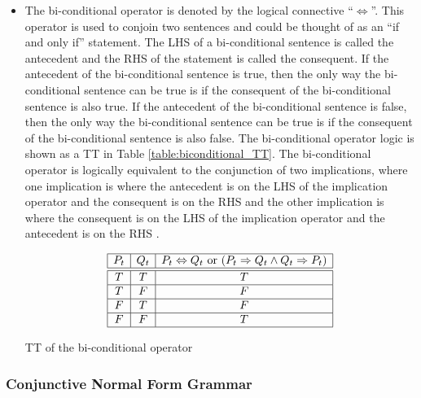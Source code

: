\begin{itemize}
\vspace{-1 cm}
	
	\item The bi-conditional operator is denoted by the logical connective ``$\Leftrightarrow$''. This operator is used to conjoin two sentences and could be thought of as an ``if and only if'' statement. The LHS of a bi-conditional sentence is called the antecedent and the RHS of the statement is called the consequent. If the antecedent of the bi-conditional sentence is true, then the only way the bi-conditional sentence can be true is if the consequent of the bi-conditional sentence is also true. If the antecedent of the bi-conditional sentence is false, then the only way the bi-conditional sentence can be true is if the consequent of the bi-conditional sentence is also false. The bi-conditional operator logic is shown as a TT in Table \ref{table:biconditional_TT}. The bi-conditional operator is logically equivalent to the conjunction of two implications, where one implication is where the antecedent is on the LHS of the implication operator and the consequent is on the RHS and the other implication is where the consequent is on the LHS of the implication operator and the antecedent is on the RHS .


\begin{table}[H]
      \centering     
       \begin{displaymath}  %
		  \begin{array}{|c|c|c|}\hline
		    P_t & Q_t & P_t \Leftrightarrow Q_t \text{ or } (P_t \Rightarrow Q_t \wedge Q_t \Rightarrow P_t) \\\hline\hline
		    T & T & T \\\hline
		    T & F & F \\\hline
		    F & T & F \\\hline
		    F & F & T \\\hline
		  \end{array}
	  \end{displaymath}
	  \caption{TT of the bi-conditional operator}
	  \label{table:biconditional_TT}
\end{table}


\end{itemize}


\subsubsection{Conjunctive Normal Form Grammar}
\label{subsubsec:CNF}

